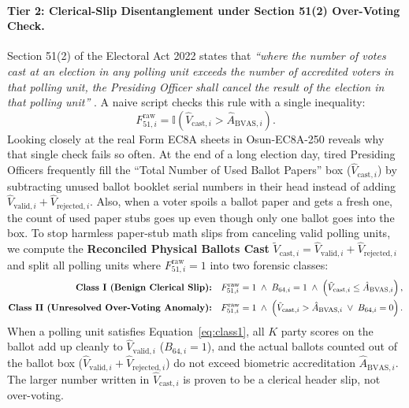 \documentclass{article}
\begin{document}
\paragraph{Tier 2: Clerical-Slip Disentanglement under Section 51(2) Over-Voting Check.}
Section 51(2) of the Electoral Act 2022 states that \emph{``where the number of votes cast at an election in any polling unit exceeds the number of accredited voters in that polling unit, the Presiding Officer shall cancel the result of the election in that polling unit''} \cite{inec2022electoral}. A naive script checks this rule with a single inequality:
\begin{equation}
F_{51, i}^{\text{raw}} = \mathbb{I}\!\left( \hat{V}_{\text{cast}, i} > \hat{A}_{\text{BVAS}, i} \right).
\label{eq:sec51_raw}
\end{equation}
Looking closely at the real Form EC8A sheets in Osun-EC8A-250 reveals why that single check fails so often. At the end of a long election day, tired Presiding Officers frequently fill the ``Total Number of Used Ballot Papers'' box ($\hat{V}_{\text{cast}, i}$) by subtracting unused ballot booklet serial numbers in their head instead of adding $\hat{V}_{\text{valid}, i} + \hat{V}_{\text{rejected}, i}$. Also, when a voter spoils a ballot paper and gets a fresh one, the count of used paper stubs goes up even though only one ballot goes into the box. To stop harmless paper-stub math slips from canceling valid polling units, we compute the \textbf{Reconciled Physical Ballots Cast} $\tilde{V}_{\text{cast}, i} = \hat{V}_{\text{valid}, i} + \hat{V}_{\text{rejected}, i}$ and split all polling units where $F_{51, i}^{\text{raw}} = 1$ into two forensic classes:
\begin{align}
\text{\textbf{Class I (Benign Clerical Slip):}} \quad & F_{51, i}^{\text{raw}} = 1 \;\wedge\; B_{64, i} = 1 \;\wedge\; \left(\tilde{V}_{\text{cast}, i} \le \hat{A}_{\text{BVAS}, i}\right), \label{eq:class1} \\
\text{\textbf{Class II (Unresolved Over-Voting Anomaly):}} \quad & F_{51, i}^{\text{raw}} = 1 \;\wedge\; \left(\tilde{V}_{\text{cast}, i} > \hat{A}_{\text{BVAS}, i} \;\lor\; B_{64, i} = 0\right). \label{eq:class2}
\end{align}
When a polling unit satisfies Equation~\ref{eq:class1}, all $K$ party scores on the ballot add up cleanly to $\hat{V}_{\text{valid}, i}$ ($B_{64, i} = 1$), and the actual ballots counted out of the ballot box ($\hat{V}_{\text{valid}, i} + \hat{V}_{\text{rejected}, i}$) do not exceed biometric accreditation $\hat{A}_{\text{BVAS}, i}$. The larger number written in $\hat{V}_{\text{cast}, i}$ is proven to be a clerical header slip, not over-voting.
\end{document}
